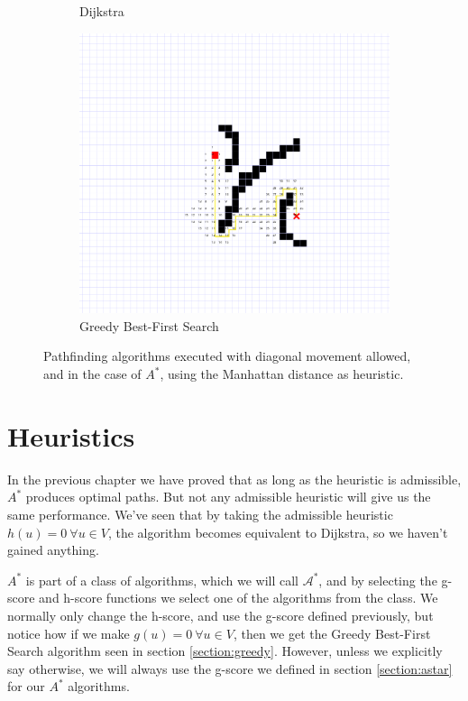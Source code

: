 \documentclass[12pt]{report}
\begin{document}
\begin{figure}
\begin{subfigure}[b]{0.45\textwidth}
	\caption{Dijkstra}
\end{subfigure}
\begin{subfigure}[b]{0.45\textwidth}
	\includegraphics[width=1\linewidth]{greedy-nodes}
	\caption{Greedy Best-First Search}
\end{subfigure}
\caption{Pathfinding algorithms executed with diagonal movement allowed, and in the case of $A^*$, using the Manhattan distance as heuristic.}
\label{fig:node-expansion}
\end{figure}


\chapter{Heuristics}
In the previous chapter we have proved that as long as the heuristic is admissible, $A^*$ produces optimal paths. But not any admissible heuristic will give us the same performance. We've seen that by taking the admissible heuristic $h(u) = 0 \  \forall u \in V$, the algorithm becomes equivalent to Dijkstra, so we haven't gained anything.

$A^*$ is part of a class of algorithms, which we will call $\mathcal{A^*}$, and by selecting the g-score and h-score functions we select one of the algorithms from the class. We normally only change the h-score, and use the g-score defined previously, but notice how if we make $g(u) = 0 \  \forall u \in V$, then we get the Greedy Best-First Search algorithm seen in section \ref{section:greedy}. However, unless we explicitly say otherwise, we will always use the g-score we defined in section \ref{section:astar} for our $A^*$ algorithms.
\end{document}
